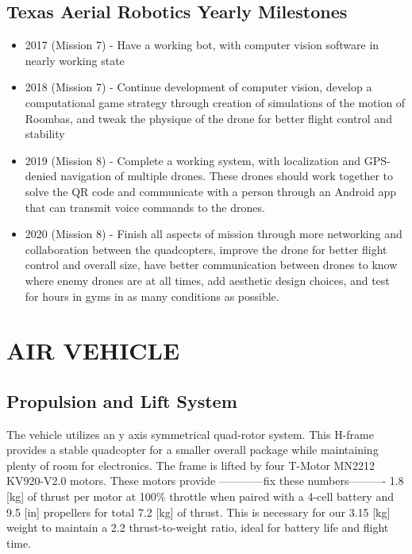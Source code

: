 \documentclass[12pt,letterpaper]{article}
\begin{document}
	\pagebreak
	\subsection*{Texas Aerial Robotics Yearly Milestones}

	\begin{itemize}

		\item 2017 (Mission 7) - Have a working bot, with computer vision software in nearly working state

		\item 2018 (Mission 7) - Continue development of computer vision, develop a computational game strategy through creation of simulations of the motion of Roombas, and tweak the physique of the drone for better flight control and stability

		\item 2019 (Mission 8) - Complete a working system, with localization and GPS-denied navigation of multiple drones. These drones should work together to solve the QR code and communicate with a person through an Android app that can transmit voice commands to the drones.

		\item 2020 (Mission 8) - Finish all aspects of mission through more networking and collaboration between the quadcopters, improve the drone for better flight control and overall size, have better communication between drones to know where enemy drones are at all times, add aesthetic design choices, and test for hours in gyms in as many conditions as possible.
	\end{itemize}

\section*{AIR VEHICLE}
	\subsection*{Propulsion and Lift System}
			The vehicle utilizes an y axis symmetrical quad-rotor system. This H-frame provides a stable quadcopter for a smaller overall package while maintaining plenty of room for electronics. The frame is lifted by four T-Motor MN2212 KV920-V2.0 motors. These motors provide
			------------fix these numbers---------- 1.8 [kg] of thrust per motor at 100\% throttle when paired with a 4-cell battery and 9.5 [in] propellers for total 7.2 [kg] of thrust. This is necessary for our 3.15 [kg] weight to maintain a 2.2 thrust-to-weight ratio, ideal for battery life and flight time.
\end{document}

